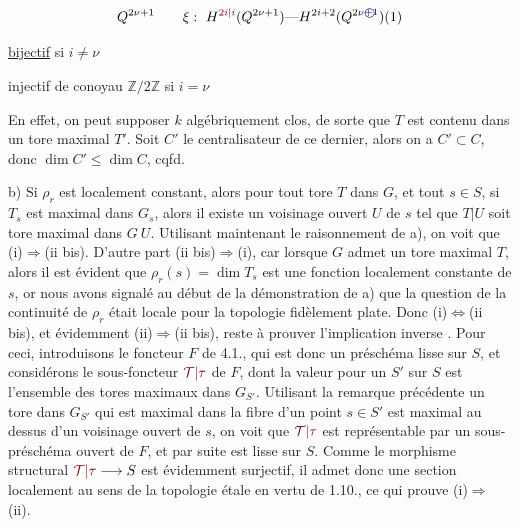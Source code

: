 \[
Q^{2\nu+1}\qquad \xi:\ H^{\unsure{2i|i}}(Q^{2\nu+1})\text{---}
H^{2i+2}(Q^{2\nu\inserted{\text{\textcircled{$+1$}}}})(1)
\]

\uline{bijectif} si $i\neq\nu$

injectif de conoyau $\mathbb Z/2\mathbb Z$ si $i=\nu$

En effet, on peut supposer $k$ algébriquement clos, de sorte que $T$ est contenu dans un tore maximal $T'$. Soit $C'$ le centralisateur de ce dernier, alors on a $C'\subset C$, donc $\dim C'\leq\dim C$, cqfd.

b)  Si $\rho_r$ est localement constant, alors pour tout tore $T$ dans $G$,  et tout $s\in S$, si $T_s$ est  maximal dans $G_s$, alors il existe un voisinage ouvert $U$ de $s$ tel que $T|U$ soit tore maximal dans $G\ U$. Utilisant maintenant le raisonnement de a), on voit que  (i)$\Longrightarrow$(ii bis). D'autre part (ii bis)$\Longrightarrow$(i), car  lorsque $G$ admet un tore maximal $T$, alors il est évident que $\rho_r(s)=\dim T_s$ est une fonction localement constante de  $s$, or nous avons signalé au début de la démonstration de a) que la question de la continuité de $\rho_r$ était locale pour la topologie fidèlement plate. Donc (i)$\Longleftrightarrow$(ii bis), et évidemment (ii)$\Longrightarrow$(ii bis), reste à prouver l'implication inverse . Pour ceci, introduisons le foncteur $F$ de  4.1., qui est donc un préschéma  lisse  sur $S$, et considérons le sous-foncteur $\unsure{\mathcal T|\tau}$ de $F$, dont la valeur  pour un $S'$ sur $S$ est l'ensemble des tores maximaux dans $G_{S'}$. Utilisant la remarque précédente  un tore dans $G_{S'}$ qui est maximal dans la fibre d'un point $s\in S'$ est maximal au dessus d'un voisinage ouvert de $s$, on voit que $\unsure{\mathcal T|\tau}$ est représentable par un sous-préschéma ouvert de $F$, et par suite est lisse  sur $S$. Comme le morphisme structural $\unsure{\mathcal T|\tau}\longrightarrow S$ est évidemment surjectif, il admet donc  une section localement au sens de la topologie étale en vertu de  1.10., ce qui prouve (i)$\Rightarrow$(ii).

